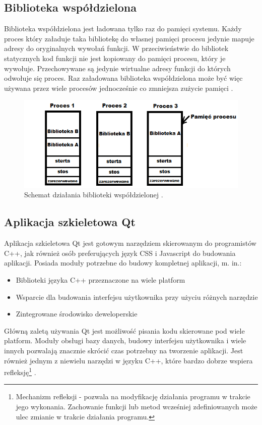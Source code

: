 \documentclass[12pt]{report}
\begin{document}
\subsection{Biblioteka współdzielona}
	\indent Biblioteka współdzielona jest ładowana tylko raz do pamięci systemu. Każdy proces który załaduje taka bibliotekę do własnej pamięci procesu jedynie mapuje adresy do oryginalnych wywołań funkcji. W przeciwieństwie do bibliotek statycznych kod funkcji nie jest kopiowany do pamięci procesu, który je wywołuje. Przechowywane są jedynie wirtualne adresy funkcji do których odwołuje się proces. Raz załadowana biblioteka współdzielona może być więc używana przez wiele procesów jednocześnie co zmniejsza zużycie pamięci \cite{dll}.
\begin{figure}[h]
	\centering
	\includegraphics[width=.8\textwidth]{images/dll.png}
	\caption{{\color{black} Schemat działania biblioteki współdzielonej \cite{dllimg}.}}
\end{figure}
\FloatBarrier
\subsection{Aplikacja szkieletowa Qt}
	\indent Aplikacja szkieletowa Qt jest gotowym narzędziem skierowanym do programistów C++, jak również osób preferujących język CSS i Javascript do budowania aplikacji. Posiada moduły potrzebne do budowy kompletnej aplikacji, m. in.:
	\begin{itemize}
	\item Biblioteki języka C++ przeznaczone na wiele platform
	\item Wsparcie dla budowania interfejsu użytkownika przy użyciu różnych narzędzie
	\item Zintegrowane środowisko deweloperskie
	\end{itemize}
	\indent Główną zaletą używania Qt jest możliwość pisania kodu skierowane pod wiele platform. Moduły obsługi bazy danych, budowy interfejsu użytkownika i wiele innych pozwalają znacznie skrócić czas potrzebny na tworzenie aplikacji. Jest również jednym z niewielu narzędzi w języku C++, które bardzo dobrze wspiera refleksję\footnote{{\color{black}Mechanizm refleksji - pozwala na modyfikację działania programu w trakcie jego wykonania. Zachowanie funkcji lub metod wcześniej zdefiniowanych może ulec zmianie w trakcie działania programu.}} \cite{qtframework}.
\end{document}
